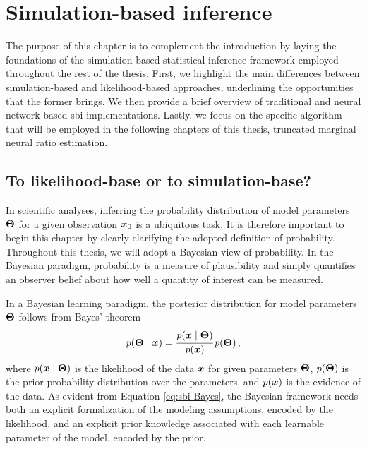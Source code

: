 \chapter{Simulation-based inference} \label{cha:sbi}
	
The purpose of this chapter is to complement the introduction by laying the foundations of the simulation-based statistical inference framework employed throughout the rest of the thesis. First, we highlight the main differences between simulation-based and likelihood-based approaches, underlining the opportunities that the former brings. We then provide a brief overview of traditional and neural network-based \gls*{sbi} implementations. Lastly, we focus on the specific algorithm that will be employed in the following chapters of this thesis, truncated marginal neural ratio estimation.


\section{To likelihood-base or to simulation-base?}\label{sec:lbi-sbi}


In scientific analyses, inferring the probability distribution of model parameters $\bm{\Theta}$ for a given observation $\bm{x}_0$ is a ubiquitous task. It is therefore important to begin this chapter by clearly clarifying the adopted definition of probability. Throughout this thesis, we will adopt a Bayesian view of probability. In the Bayesian paradigm, probability is a measure of plausibility and simply quantifies an observer belief about how well a quantity of interest can be measured.

In a Bayesian learning paradigm, the posterior distribution for model parameters $\bm{\Theta}$ follows from Bayes' theorem
\begin{equation} \label{eq:sbi-Bayes}
    p(\bm{\Theta}\mid\bm{x})=\cfrac{p(\bm{x}\mid\bm{\Theta})}{p(\bm{x})} \, p(\bm{\Theta}) \, ,
\end{equation}
where $p(\bm{x}\mid\bm{\Theta})$ is the likelihood of the data $\bm{x}$ for given parameters $\bm{\Theta}$, $p(\bm{\Theta})$ is the prior probability distribution over the parameters, and $p(\bm{x})$ is the evidence of the data.  
As evident from Equation \eqref{eq:sbi-Bayes}, the Bayesian framework needs both an explicit formalization of the modeling assumptions, encoded by the likelihood, and an explicit prior knowledge associated with each learnable parameter of the model, encoded by the prior. %

